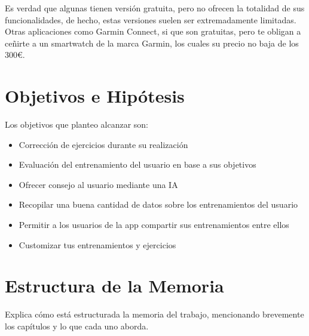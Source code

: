 Es verdad que algunas tienen versión gratuita, pero no ofrecen la totalidad de sus funcionalidades, de hecho, estas versiones suelen ser extremadamente limitadas. Otras aplicaciones como Garmin Connect, si que son gratuitas, pero te obligan a ceñirte a un smartwatch de la marca Garmin, los cuales su precio no baja de los 300€.

\section{Objetivos e Hipótesis}
Los objetivos que planteo alcanzar son:
\begin{itemize}
	\item Corrección de ejercicios durante su realización
	\item Evaluación del entrenamiento del usuario en base a sus objetivos
	\item Ofrecer consejo al usuario mediante una IA
	\item Recopilar una buena cantidad de datos sobre los entrenamientos del usuario
	\item Permitir a los usuarios de la app compartir sus entrenamientos entre ellos
	\item Customizar tus entrenamientos y ejercicios
\end{itemize}

\section{Estructura de la Memoria}
Explica cómo está estructurada la memoria del trabajo, mencionando brevemente los capítulos y lo que cada uno aborda.